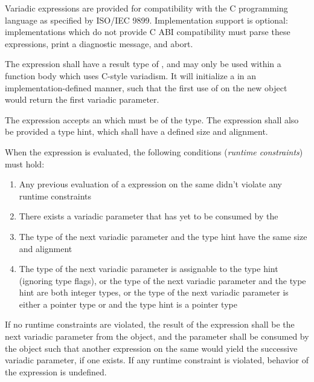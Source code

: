 \specsubsubitem
Variadic expressions are provided for compatibility with the C programming
language as specified by ISO/IEC 9899. Implementation support is optional:
implementations which do not provide C ABI compatibility must parse these
expressions, print a diagnostic message, and abort.


\specsubsubitem
The  expression shall have a result type of
, and may only be used within a function body which uses
C-style variadism. It will initialize a  in an
implementation-defined manner, such that the first use of  on
the new object would return the first variadic parameter.

\specsubsubitem
The  expression accepts an  which
must be of the  type. The expression shall also be provided a
type hint, which shall have a defined size and alignment.

\specsubsubitem
When the  expression is evaluated, the following conditions
(\textit{runtime constraints}) must hold:

\begin{enumerate}
\item Any previous evaluation of a  expression on the same
	 didn't violate any runtime constraints
\item There exists a variadic parameter that has yet to be consumed by the
\item The type of the next variadic parameter and the type hint have the same
	size and alignment
\item The type of the next variadic parameter is assignable to the type hint
	(ignoring type flags), or the type of the next variadic parameter and
	the type hint are both integer types, or the type of the next variadic
	parameter is either a pointer type or  and the type hint
	is a pointer type
\end{enumerate}

\specsubsubitem
If no runtime constraints are violated, the result of the 
expression shall be the next variadic parameter from the 
object, and the parameter shall be consumed by the object such that another
 expression on the same  would
yield the successive variadic parameter, if one exists. If any runtime
constraint is violated, behavior of the  expression is
undefined.

